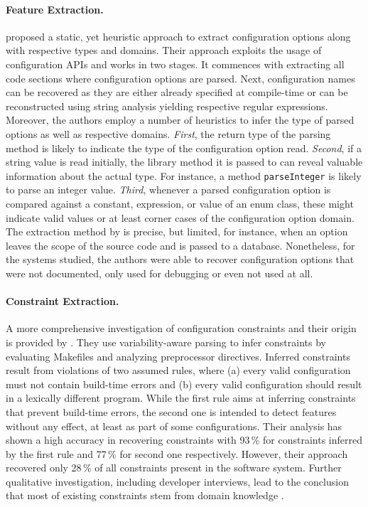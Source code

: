 \paragraph{Feature Extraction.} \cite{rabkin_static_2011} proposed a static, yet
heuristic approach to extract configuration options along with respective types and domains. Their approach
exploits the usage of configuration APIs and works
in two stages. It commences with extracting all code sections where
configuration options are parsed. Next, configuration names can be
recovered as they are either already specified at compile-time or can be
reconstructed using string analysis yielding respective regular expressions.
Moreover, the authors employ a number of heuristics to infer the type of parsed
options as well as respective domains. \emph{First}, the return type of the
parsing method is likely to indicate the type of the configuration option read.
\emph{Second}, if a string value is read initially, the library method it is
passed to can reveal valuable information about the actual type. For instance, a method
\texttt{parseInteger} is likely to parse an integer value. \emph{Third},
whenever a parsed configuration option is compared against a constant, expression, or value
of an enum class, these might indicate valid values or at least corner cases of
the configuration option domain. The extraction method by
\cite{rabkin_static_2011} is precise, but limited, for instance, when an
option leaves the scope of the source code and is passed to a database.
Nonetheless, for the systems studied, the authors were able to recover
configuration options that were not documented, only used for debugging or even not used at
all.

\paragraph{Constraint Extraction.} 
A more comprehensive investigation of configuration
constraints and their origin is provided by
\cite{nadi_mining_2014,nadi_where_2015}. They use variability-aware parsing to
infer constraints by evaluating Makefiles and  analyzing preprocessor
directives. Inferred constraints result from violations of two assumed rules,
where (a) every valid configuration must not contain build-time errors and (b)
every valid configuration should result in a lexically different program.
While the
first rule aims at inferring constraints that prevent build-time errors, the
second one is intended to detect features without any effect, at least as part
of some configurations. Their analysis has shown a high accuracy
in recovering constraints with 93\,\% for constraints inferred by the first rule
and 77\,\% for second one respectively. However, their approach
recovered only 28\,\% of all constraints present in the software system.
Further qualitative investigation, including developer interviews, lead to
the conclusion that most of existing constraints stem from domain knowledge
\citep{nadi_where_2015}.

